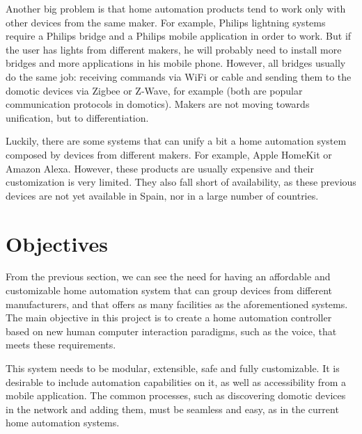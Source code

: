 Another big problem is that home automation products tend to work only with other devices from the same maker. For example, Philips
lightning systems require a Philips bridge and a Philips mobile application in order to work. But if the user has lights from different
makers, he will probably need to install more bridges and more applications in his mobile phone. However, all bridges usually do the same
job: receiving commands via WiFi or cable and sending them to the domotic devices via Zigbee or Z-Wave, for example (both are popular
communication protocols in domotics). Makers are not moving towards unification, but to differentiation.

Luckily, there are some systems that can unify a bit a home automation system composed by devices from different makers. For example,
Apple HomeKit\cite{appleIOSHome} or Amazon Alexa\cite{amazonAlexa}. However, these products are usually expensive and their 
customization is very limited. They also fall short of availability, as these previous devices are not yet available in Spain, nor 
in a large number of countries.

\section{Objectives}
From the previous section, we can see the need for having an affordable and customizable home automation system that can group 
devices from different manufacturers, and that offers as many facilities as the aforementioned systems. The main objective in this 
project is to create a home automation controller based on new human computer interaction paradigms, such as the voice, that meets
these requirements.

This system needs to be modular, extensible, safe and fully customizable. It is desirable to include automation capabilities on it, 
as well as accessibility from a mobile application. The common processes, such as discovering domotic devices in the network and
adding them, must be seamless and easy, as in the current home automation systems.

